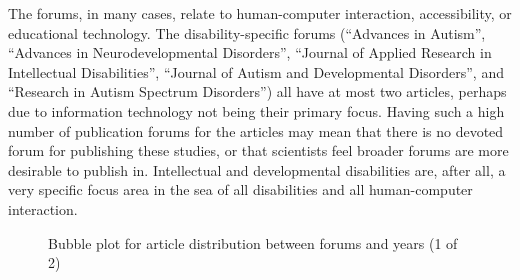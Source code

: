 \documentclass[utf8,english]{gradu3}
\newcommand{\createSymbolicCoords}[3]{
        \def\ylistmacro{}%
        \pgfplotstableforeachcolumnelement{#3}\of#2\as\entry{%
                \xifinlist{\entry}{\ylistmacro}{}{%
                        \listxadd{\ylistmacro}{\entry}%
                        \edef#1{#1{\entry},}%
                }%
        }
}
\begin{document}
The forums, in many cases, relate to human-computer interaction, accessibility, or educational technology.
The disability-specific forums (``Advances in Autism'', ``Advances in Neurodevelopmental Disorders'',
``Journal of Applied Research in Intellectual Disabilities'', ``Journal of Autism and Developmental Disorders'', and
``Research in Autism Spectrum Disorders'') all have at most two articles,
perhaps due to information technology not being their primary focus.
Having such a high number of publication forums for the articles
may mean that there is no devoted forum for publishing these studies,
or that scientists feel broader forums are more desirable to publish in.
Intellectual and developmental disabilities are, after all, a very specific focus area
in the sea of all disabilities and all human-computer interaction.

\forumDataTable
\def\forumCoordsFirst{}
\createSymbolicCoords{\forumCoordsFirst}{\forumDataTable}{Forum}
\begin{figure}[H]
  \caption{Bubble plot for article distribution between forums and years (1 of 2)}
  \label{kuvaFoorumit1}
\end{figure}
\end{document}
